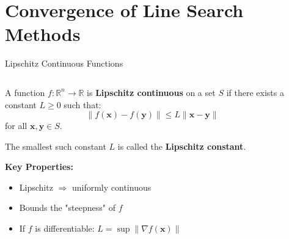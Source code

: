 \documentclass[aspectratio=1610]{beamer}
\begin{document}
\section{Convergence of Line Search Methods}

\begin{frame}{Lipschitz Continuous Functions}
  \begin{columns}
    \begin{column}{0.5\textwidth}
      \begin{definition}
        A function $f: \mathbb{R}^n \to \mathbb{R}$ is \textbf{Lipschitz continuous} on a set $S$ if there exists a constant $L \geq 0$ such that:
        $$\|f(\mathbf{x}) - f(\mathbf{y})\| \leq L \|\mathbf{x} - \mathbf{y}\|$$
        for all $\mathbf{x}, \mathbf{y} \in S$.
        
        The smallest such constant $L$ is called the \textbf{Lipschitz constant}.
      \end{definition}
      
      \vspace{0.3cm}
      
      \textbf{Key Properties:}
      \begin{itemize}
        \item Lipschitz $\Rightarrow$ uniformly continuous
        \item Bounds the "steepness" of $f$
        \item If $f$ is differentiable: $L = \sup \|\nabla f(\mathbf{x})\|$
      \end{itemize}
    \end{column}
    
    \begin{column}{0.5\textwidth}
      \begin{center}
\end{center}
\end{column}
\end{columns}
\end{frame}
\end{document}
